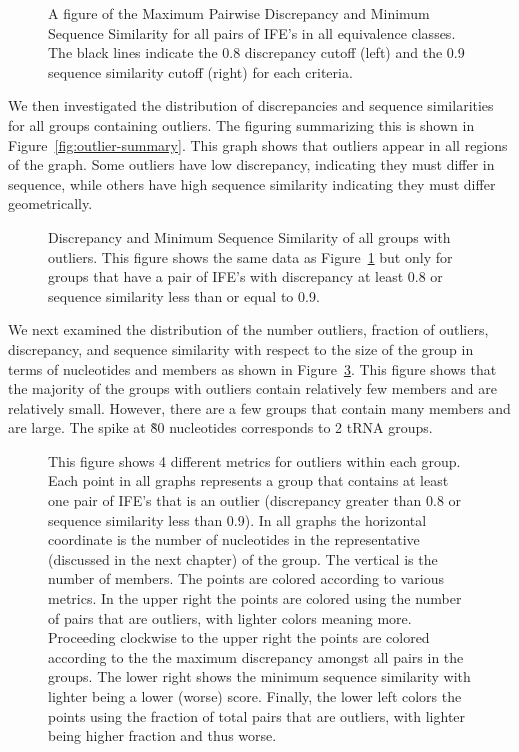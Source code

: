 \begin{figure}
  \caption{A figure of the Maximum Pairwise Discrepancy and Minimum Sequence
    Similarity for all pairs of IFE’s in all equivalence classes. The black
    lines indicate the 0.8 discrepancy cutoff (left) and the 0.9 sequence
  similarity cutoff (right) for each criteria.}
  \label{fig:eq-summary}
\end{figure}

We then investigated the distribution of discrepancies and sequence similarities
for all groups containing outliers. The figuring summarizing this is shown in
Figure~\ref{fig:outlier-summary}. This graph shows that outliers appear in all regions of
the graph. Some outliers have low discrepancy, indicating they must differ in
sequence, while others have high sequence similarity indicating they must differ
geometrically.

\begin{figure}
  \caption{Discrepancy and Minimum Sequence Similarity of all groups with
    outliers. This figure shows the same data as Figure~\ref{fig:eq-summary} but only for
    groups that have a pair of IFE’s with discrepancy at least 0.8 or sequence
  similarity less than or equal to 0.9.}
  \label{fig:eq-outlier-summary}
\end{figure}

We next examined the distribution of the number outliers, fraction of outliers,
discrepancy, and sequence similarity with respect to the size of the group in
terms of nucleotides and members as shown in Figure~\ref{fig:outlier-detail}.
This figure shows that the majority of the groups with outliers contain
relatively few members and are relatively small. However, there are a few groups
that contain many members and are large. The spike at \~80 nucleotides
corresponds to 2 tRNA groups.  

\begin{figure}
  \caption{This figure shows 4 different metrics for outliers within each group.
    Each point in all graphs represents a group that contains at least one pair
    of IFE’s that is an outlier (discrepancy greater than 0.8 or sequence
    similarity less than 0.9). In all graphs the horizontal coordinate is the
    number of nucleotides in the representative (discussed in the next chapter)
    of the group. The vertical is the number of members. The points are colored
    according to various metrics. In the upper right the points are colored
    using the number of pairs that are outliers, with lighter colors meaning
    more. Proceeding clockwise to the upper right the points are colored
    according to the the maximum discrepancy amongst all pairs in the groups.
    The lower right shows the minimum sequence similarity with lighter being a
    lower (worse) score. Finally, the lower left colors the points using the
    fraction of total pairs that are outliers, with lighter being higher
  fraction and thus worse.}
  \label{fig:outlier-detail}
\end{figure}


